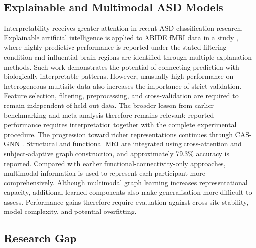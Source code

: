 \subsection{Explainable and Multimodal ASD Models}

Interpretability receives greater attention in recent ASD classification research. Explainable artificial intelligence is applied to ABIDE fMRI data in a study \cite{Vidyaetal2025}, where highly predictive performance is reported under the stated filtering condition and influential brain regions are identified through multiple explanation methods. Such work demonstrates the potential of connecting prediction with biologically interpretable patterns. However, unusually high performance on heterogeneous multisite data also increases the importance of strict validation. Feature selection, filtering, preprocessing, and cross-validation are required to remain independent of held-out data. The broader lesson from earlier benchmarking \cite{Dadietal2019} and meta-analysis \cite{Santanaetal2022} therefore remains relevant: reported performance requires interpretation together with the complete experimental procedure. The progression toward richer representations continues through CAS-GNN \cite{Tangetal2026CASGNN}. Structural and functional MRI are integrated using cross-attention and subject-adaptive graph construction, and approximately 79.3\% accuracy is reported. Compared with earlier functional-connectivity-only approaches, multimodal information is used to represent each participant more comprehensively. Although multimodal graph learning increases representational capacity, additional learned components also make generalisation more difficult to assess. Performance gains therefore require evaluation against cross-site stability, model complexity, and potential overfitting.

\subsection{Research Gap}

